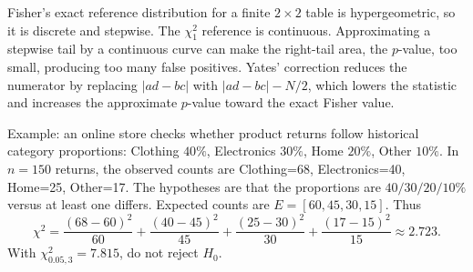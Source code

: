\begin{solproblema}[prob:f622374]
Fisher's exact reference distribution for a finite $2\times2$ table is hypergeometric, so it is discrete and stepwise. The $\chi^2_1$ reference is continuous. Approximating a stepwise tail by a continuous curve can make the right-tail area, the $p$-value, too small, producing too many false positives. Yates' correction reduces the numerator by replacing $|ad-bc|$ with $|ad-bc|-N/2$, which lowers the statistic and increases the approximate $p$-value toward the exact Fisher value.
\end{solproblema}

\begin{solproblema}[prob:369a6a1]
Example: an online store checks whether product returns follow historical category proportions: Clothing $40\%$, Electronics $30\%$, Home $20\%$, Other $10\%$. In $n=150$ returns, the observed counts are Clothing=68, Electronics=40, Home=25, Other=17. The hypotheses are that the proportions are $40/30/20/10\%$ versus at least one differs. Expected counts are $E=[60,45,30,15]$. Thus
\[
	\chi^2=\frac{(68-60)^2}{60}+\frac{(40-45)^2}{45}
	+\frac{(25-30)^2}{30}+\frac{(17-15)^2}{15}
	\approx2.723.
\]
With $\chi^2_{0.05,3}=7.815$, do not reject $H_0$.
\end{solproblema}
